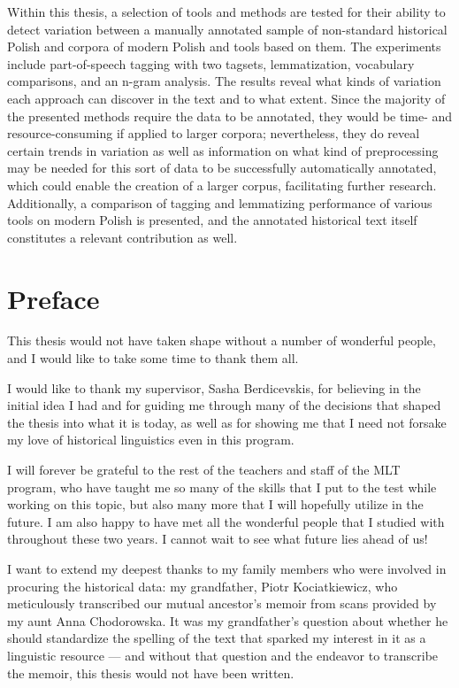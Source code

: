 \documentclass[12pt, a4paper]{article}  %
\begin{document}
Within this thesis, a selection of tools and methods are tested for their ability to detect variation between a manually annotated sample of non-standard historical Polish and corpora of modern Polish and tools based on them. The experiments include part-of-speech tagging with two tagsets, lemmatization, vocabulary comparisons, and an n-gram analysis. The results reveal what kinds of variation each approach can discover in the text and to what extent. Since the majority of the presented methods require the data to be annotated, they would be time- and resource-consuming if applied to larger corpora; nevertheless, they do reveal certain trends in variation as well as information on what kind of preprocessing may be needed for this sort of data to be successfully automatically annotated, which could enable the creation of a larger corpus, facilitating further research. Additionally, a comparison of tagging and lemmatizing performance of various tools on modern Polish is presented, and the annotated historical text itself constitutes a relevant contribution as well.

\thispagestyle{empty}

\newpage
\section*{Preface}

This thesis would not have taken shape without a number of wonderful people, and I would like to take some time to thank them all.  

I would like to thank my supervisor, Sasha Berdicevskis, for believing in the initial idea I had and for guiding me through many of the decisions that shaped the thesis into what it is today, as well as for showing me that I need not forsake my love of historical linguistics even in this program.

I will forever be grateful to the rest of the teachers and staff of the MLT program, who have taught me so many of the skills that I put to the test while working on this topic, but also many more that I will hopefully utilize in the future. I am also happy to have met all the wonderful people that I studied with throughout these two years. I cannot wait to see what future lies ahead of us!

I want to extend my deepest thanks to my family members who were involved in procuring the historical data: my grandfather, Piotr Kociatkiewicz, who meticulously transcribed our mutual ancestor's memoir from scans provided by my aunt Anna Chodorowska. It was my grandfather's question about whether he should standardize the spelling of the text that sparked my interest in it as a linguistic resource --- and without that question and the endeavor to transcribe the memoir, this thesis would not have been written.
\end{document}

